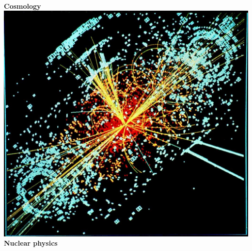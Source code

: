 \documentclass{beamer}
\newcommand{\pnote}[1] {}
\begin{document}
\begin{frame}
\begin{columns}
\begin{column}{0.5\textwidth}
      \\
      \textbf{Cosmology}
      \includegraphics[width=0.8\columnwidth]{figures/higgs.jpg}      \\
      \textbf{Nuclear physics}
    \end{column}
  \end{columns}
  \pnote{
    Science is a classic example where we must use data to understand how the world works, essentially creating a belief about which models are true. In some domains, like climatology, these models are complex simulators with many parameters. These and are validated using data from satellites and sea buoys. In others we can also general machine learning models such as Gaussian processes, used to map the distribution of dark matter in the universe, or neural networks, used with a lot of success recently to model protein folding.

However, we always face the problem data collection. Given what we believe right now, what data should we collect, what experiment should we perform, in order to increase our understanding of the world? So e.g. should we use robotic submarines to monitor deep sea temperatures? Should we generate our own news stories in a social network in order to study the interaction between communities and news propagation? 
   }
\end{frame}
\end{document}
